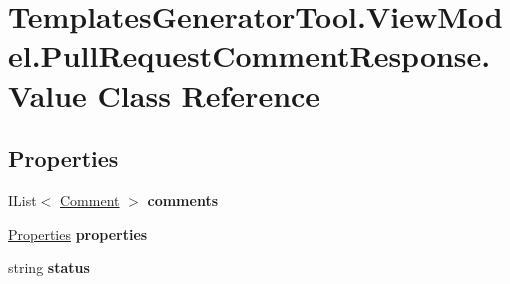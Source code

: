 \hypertarget{class_templates_generator_tool_1_1_view_model_1_1_pull_request_comment_response_1_1_value}{}\section{Templates\+Generator\+Tool.\+View\+Model.\+Pull\+Request\+Comment\+Response.\+Value Class Reference}
\label{class_templates_generator_tool_1_1_view_model_1_1_pull_request_comment_response_1_1_value}
\subsection*{Properties}
\begin{DoxyCompactItemize}
\item 
\mbox{\label{class_templates_generator_tool_1_1_view_model_1_1_pull_request_comment_response_1_1_value_aec5c80904c36efefa46aa54377b0af91}} 
I\+List$<$ \mbox{\hyperlink{class_templates_generator_tool_1_1_view_model_1_1_pull_request_comment_response_1_1_comment}{Comment}} $>$ {\bfseries comments}
\item 
\mbox{\label{class_templates_generator_tool_1_1_view_model_1_1_pull_request_comment_response_1_1_value_af2f0ecb9401a00eb0b2e7d20a1175d8b}} 
\mbox{\hyperlink{class_templates_generator_tool_1_1_view_model_1_1_pull_request_comment_response_1_1_properties}{Properties}} {\bfseries properties}
\item 
\mbox{\label{class_templates_generator_tool_1_1_view_model_1_1_pull_request_comment_response_1_1_value_a664fdb12254d2d5cd02a2cb23988ed54}} 
string {\bfseries status}
\item 
\mbox{\label{class_templates_generator_tool_1_1_view_model_1_1_pull_request_comment_response_1_1_value_a551ce24b2124b94d58285f30279ffa2f}} 

\end{DoxyCompactItemize}
